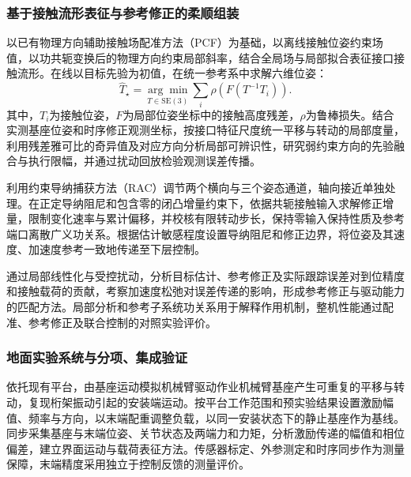 \documentclass[UTF8,a4paper,zihao=-4,fontset=fandol]{ctexart}
\newcommand{\rev}[1]{{\color{red}#1}}
\newcommand{\SE}{\mathrm{SE}(3)}
\begin{document}
\subsubsection{基于接触流形表征与参考修正的柔顺组装}

\rev{以}已有物理方向辅助接触场配准方法（PCF）\rev{为基础}，以离线接触位姿约束场值，以功共轭变换\rev{后}的物理方向约束局部斜率，结合全局场与局部拟合表征接口接触\rev{流形}。在线以目标先验为初值，\rev{在统一参考系中}求解六维\rev{位姿}：
\begin{equation}
 \widehat T_\star=\underset{T\in\SE}{\arg\min}
 \sum_i\rho\!\left(F(T^{-1}T_i)\right).
 \label{eq:registration}
\end{equation}
其中，$T_i$为接触位姿，$F$为局部位姿坐标中的接触高度残差，$\rho$为鲁棒损失。\rev{结合}实测基座位姿\rev{和时序}修正观测坐标，\rev{按接口特征尺度统一平移与转动的}局部\rev{度量，利用残差雅可比的奇异值及对应方向分析局部可辨识性，研究弱约束方向的先验融合}与执行限幅\rev{，并}通过扰动回放\rev{检验观测}误差\rev{传播}。

\rev{利用}约束导纳捕获方法（RAC）调节两个横向\rev{与}三个姿态通道，轴向接近单独处理。在正定\rev{导纳}阻尼\rev{和}包含零的闭凸增量\rev{约束下}，\rev{依据共轭接触输入求解修正增量，限制变化速率与}累计偏移，\rev{并校核}有限转动步长，\rev{保持}零输入保持\rev{性质及}参考端口离散广义功\rev{关系}。\rev{根据估计敏感程度设置导纳阻尼和}修正\rev{边界，将}位姿\rev{及其}速度、加速度参考\rev{一致地传递至下层控制。}

\rev{通过局部线性化与受控扰动}，分析\rev{目标估计、参考}修正\rev{及实际}跟踪误差对到位精度和接触\rev{载荷的贡献，考察加速度松弛对误差传递}的影响，\rev{形成}参考修正与\rev{驱动}能力的匹配\rev{方法}。局部\rev{分析}和参考子系统\rev{功关系用于解释作用机制}，整机\rev{性能通过配准、参考修正及联合控制的}对照\rev{实验}评价。

\subsubsection{地面\rev{实验}系统与分项、集成验证}

依托现有平台，\rev{由}基座运动模拟\rev{机械臂}驱动作业机械臂基座产生可重复的平移\rev{与}转动，\rev{复现}桁架振动引起的安装端运动。\rev{按}平台工作范围和预实验结果\rev{设置}激励幅值、频率与方向，\rev{以}末端配重调整\rev{负载，}以同一安装状态\rev{下的静止基座}作为基线。同步采集\rev{基座与末端位姿、}关节状态\rev{及两端}力和力矩，\rev{分析激励传递的幅值和相位偏差，建立界面运动与载荷表征方法。传感器}标定\rev{、}外参\rev{测定}和\rev{时序同步作为测量保障}，\rev{末端精度}采用独立于控制反馈的测量评价。
\end{document}
